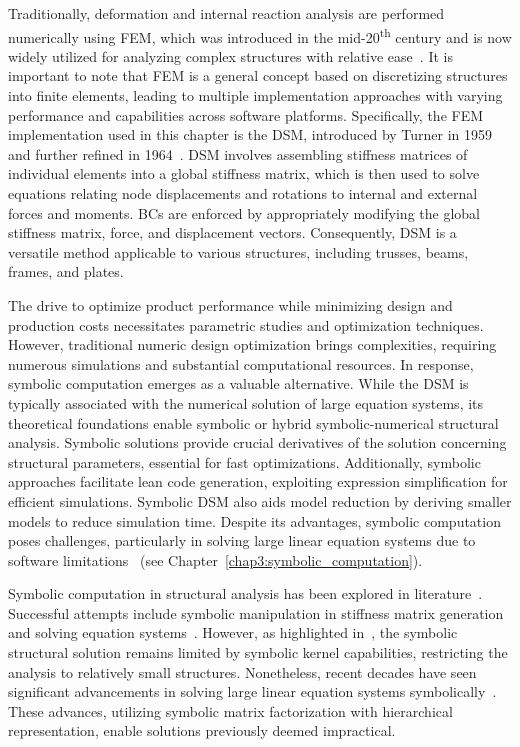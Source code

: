 Traditionally, deformation and internal reaction analysis are performed numerically using \ac{FEM}, which was introduced in the mid-20\textsuperscript{th} century and is now widely utilized for analyzing complex structures with relative ease~\cite{felippa2001historical}. It is important to note that \ac{FEM} is a general concept based on discretizing structures into finite elements, leading to multiple implementation approaches with varying performance and capabilities across software platforms. Specifically, the \ac{FEM} implementation used in this chapter is the \ac{DSM}, introduced by Turner in 1959~\cite{turner1959direct} and further refined in 1964~\cite{turner1964further}. \ac{DSM} involves assembling stiffness matrices of individual elements into a global stiffness matrix, which is then used to solve equations relating node displacements and rotations to internal and external forces and moments. \acp{BC} are enforced by appropriately modifying the global stiffness matrix, force, and displacement vectors. Consequently, \ac{DSM} is a versatile method applicable to various structures, including trusses, beams, frames, and plates.

The drive to optimize product performance while minimizing design and production costs necessitates parametric studies and optimization techniques. However, traditional numeric design optimization brings complexities, requiring numerous simulations and substantial computational resources. In response, symbolic computation emerges as a valuable alternative. While the \ac{DSM} is typically associated with the numerical solution of large equation systems, its theoretical foundations enable symbolic or hybrid symbolic-numerical structural analysis. Symbolic solutions provide crucial derivatives of the solution concerning structural parameters, essential for fast optimizations. Additionally, symbolic approaches facilitate lean code generation, exploiting expression simplification for efficient simulations. Symbolic \ac{DSM} also aids model reduction by deriving smaller models to reduce simulation time. Despite its advantages, symbolic computation poses challenges, particularly in solving large linear equation systems due to software limitations~\cite{carette2006linear, zhou2007symbolic} (see Chapter~\ref{chap3:symbolic_computation}).

Symbolic computation in structural analysis has been explored in literature~\cite{noor1979computerized, pavlovic2003symbolic}. Successful attempts include symbolic manipulation in stiffness matrix generation~\cite{cecchi1977automatic} and solving equation systems~\cite{ioakimidis1992application, beltzer2012variational}. However, as highlighted in~\cite{pavlovic2003symbolic}, the symbolic structural solution remains limited by symbolic kernel capabilities, restricting the analysis to relatively small structures. Nonetheless, recent decades have seen significant advancements in solving large linear equation systems symbolically~\cite{carette2006linear, zhou2007symbolic}. These advances, utilizing symbolic matrix factorization with hierarchical representation, enable solutions previously deemed impractical.

